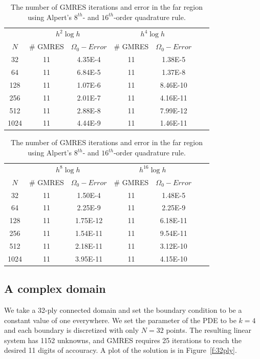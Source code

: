 \documentclass[final]{siamltex}
\begin{document}
\begin{table}[htps]
\centering
\begin{tabular}{c|cc|cc|cc}
\multicolumn{1}{c|}{} &
\multicolumn{2}{c|}{$h^{2}\log h$} &
\multicolumn{2}{c}{$h^{4}\log h$} \\
$N$  & \# GMRES & $\Omega_{0}-Error$  
     & \# GMRES & $\Omega_{0}-Error$ \\
\hline
32   & 11 & 4.35E-4 & 11 & 1.38E-5  \\
64   & 11 & 6.84E-5 & 11 & 1.37E-8  \\
128  & 11 & 1.07E-6 & 11 & 8.46E-10 \\
256  & 11 & 2.01E-7 & 11 & 4.16E-11 \\
512  & 11 & 2.88E-8 & 11 & 7.99E-12 \\
1024 & 11 & 4.44E-9 & 11 & 1.46E-11 \\
\end{tabular}
\caption{\label{t:example2a} The number of GMRES iterations and error in
the far region using Alpert's $2^{nd}$- and $4^{th}$-order quadrature
rule.}

\begin{tabular}{c|cc|cc|cc}
\multicolumn{1}{c|}{} &
\multicolumn{2}{c|}{$h^{8}\log h$} &
\multicolumn{2}{c}{$h^{16}\log h$} \\
$N$  & \# GMRES & $\Omega_{0}-Error$  
     & \# GMRES & $\Omega_{0}-Error$ \\
\hline
32   & 11 & 1.50E-4  & 11 & 1.48E-5  \\
64   & 11 & 2.25E-9  & 11 & 2.25E-9  \\
128  & 11 & 1.75E-12 & 11 & 6.18E-11 \\
256  & 11 & 1.54E-11 & 11 & 9.54E-11 \\
512  & 11 & 2.18E-11 & 11 & 3.12E-10 \\
1024 & 11 & 3.95E-11 & 11 & 4.15E-10 \\
\end{tabular}
\caption{\label{t:example2b} The number of GMRES iterations and error in
the far region using Alpert's $8^{th}$- and $16^{th}$-order quadrature
rule.}

\end{table}



\subsection*{A complex domain}
We take a 32-ply connected domain and set the boundary condition to be a
constant value of one everywhere.  We set the parameter of the PDE to be
$k=4$ and each boundary is discretized with only $N=32$ points.  The
resulting linear system has 1152 unknowns, and GMRES requires 25
iterations to reach the desired 11 digits of accouracy.  A plot of the
solution is in Figure~\ref{f:32ply}.
\end{document}
